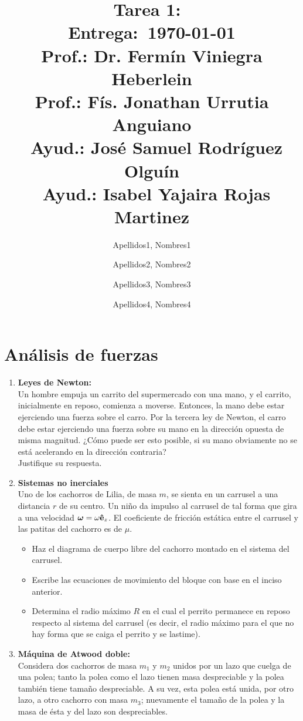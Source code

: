 \documentclass[letterpaper]{article}
\title{
    \vspace{-1.5cm}
    \textbf{Tarea 1:\ \Titletarea}\\
    \normalsize\vspace{0.1in}\small{\textbf{Entrega}:~\today}\\
    \vspace{0.1in}\large{Prof.: Dr. Fermín Viniegra Heberlein\\
    \; Prof.: Fís. Jonathan Urrutia Anguiano\\
    \ Ayud.: José Samuel Rodríguez Olguín\\
    \ Ayud.: Isabel Yajaira Rojas Martinez}
    \vspace{0.5cm}
}
\author{
    Apellidos1, Nombres1
    \and
    Apellidos2, Nombres2
    \and 
    Apellidos3, Nombres3
    \and 
    Apellidos4, Nombres4
}
\date{}
\newcommand{\salirmodo}{\leavevmode \\}
\DeclareRobustCommand{\uvec}[1]{{%
  \ifcsname uvec#1\endcsname
     \csname uvec#1\endcsname
   \else
    \bm{\hat{\mathbf{#1}}}%
   \fi
}}
\begin{document}
\maketitle
\thispagestyle{fancy}
\section*{Análisis de fuerzas}
\begin{enumerate}[label=\textbf{1.\arabic*)}]
    \item \textbf{Leyes de Newton:}\salirmodo
    Un hombre empuja un carrito del supermercado con una mano, y el carrito, inicialmente en reposo, comienza a moverse. Entonces, la mano debe estar ejerciendo una fuerza sobre el carro. Por la tercera ley de Newton, el carro debe estar ejerciendo una fuerza sobre su mano en la dirección opuesta de misma magnitud. ¿Cómo puede ser esto posible, si su mano obviamente no se está acelerando en la dirección contraria? \\
    Justifique su respuesta.
    \item \textbf{Sistemas no inerciales}\salirmodo
    Uno de los cachorros de Lilia, de masa \(m\), se sienta en un carrusel a una distancia \(r\) de su centro. Un niño da impulso al carrusel de tal forma que gira a una velocidad \(\bm{\omega}=\omega\uvec{e}_{z}\). El coeficiente de fricción estática entre el carrusel y las patitas del cachorro es de \(\mu\).
\begin{itemize}[label = \textbullet]
    \item Haz el diagrama de cuerpo libre del cachorro montado en el sistema del carrusel.
    \item Escribe las ecuaciones de movimiento del bloque con base en el inciso anterior.
    \item Determina el radio máximo \(R\) en el cual el perrito permanece en reposo respecto al sistema del carrusel (es decir, el radio máximo para el que no hay forma que se caiga el perrito y se lastime).
\end{itemize}
    \item \textbf{Máquina de Atwood doble:}\salirmodo
    Considera dos cachorros de masa \(m_{1}\) y \(m_{2}\) unidos por un lazo que cuelga de una polea; tanto la polea como el lazo tienen masa despreciable y la polea también tiene tamaño despreciable. A su vez, esta polea está unida, por otro lazo, a otro cachorro con masa \(m_{3}\); nuevamente el tamaño de la polea y la masa de ésta y del lazo son despreciables.
    \begin{itemize}[label = \textbullet]

\end{itemize}
\end{enumerate}
\end{document}
